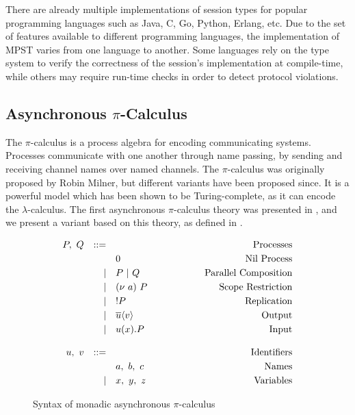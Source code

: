 \documentclass[12pt,twoside]{report}
\newcommand{\white}{\ \ \ \ \ \ \ \ \ \ \ \ }
\begin{document}
There are already multiple implementations of session types for popular programming languages such as Java\cite{java}, C\cite{mpstc}, Go\cite{parametrictypes}, Python\cite{python}, Erlang\cite{erlang}, etc. Due to the set of features available to different programming languages, the implementation of MPST varies from one language to another. Some languages rely on the type system to verify the correctness of the session's implementation at compile-time, while others may require run-time checks in order to detect protocol violations. 

\subsection{Asynchronous $\pi$-Calculus}\label{pi-calculus}
The $\pi$-calculus is a process algebra for encoding communicating systems. Processes communicate with one another through name passing, by sending and receiving channel names over named channels. The $\pi$-calculus was originally proposed by Robin Milner\cite{milnerpicalc}, but different variants have been proposed since. It is a powerful model which has been shown to be Turing-complete\cite{turingcomplete}, as it can encode the $\lambda$-calculus. The first asynchronous $\pi$-calculus theory was presented in \cite{asyncandpicalc}, and we present a variant based on this theory, as defined in \cite{co406}.

\begin{figure}[h]
    \centering
    \begin{equation*}
    \centering
    \begin{array}{rrlcr}
        P,\ Q & ::= && \white & \text{Processes} \\[2.75pt]
             &   & 0 & \white & \text{Nil\ Process}  \\[2.75pt]
             & | & P\ |\ Q & \white & \text{Parallel\ Composition} \\[2.75pt]
             & | & (\nu\ a)\ P & \white & \text{Scope Restriction} \\[2.75pt]
             & | & !P & \white  & \text{Replication} \\[2.75pt]
             & | & \overline{u}\langle v \rangle & \white & \text{Output} \\[2.75pt] 
             & | & u(x).P & \white & \text{Input} \\\\
        u,\ v & ::= && \white & \text{Identifiers} \\[2.75pt]
              &   & a,\ b,\ c & \white & \text{Names} \\[2.75pt]
              & | & x,\ y,\ z & \white & \text{Variables} \\
        \end{array}
    \end{equation*}
    \caption{Syntax of monadic asynchronous  $\pi$-calculus}
    \label{picalc_syntax}
\end{figure}{}
\end{document}
